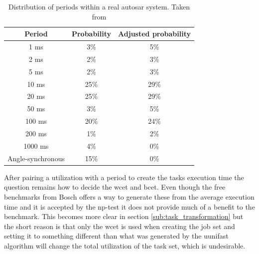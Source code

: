 \documentclass{kththesis}
\begin{document}
\begin{table}
    \centering
    \begin{tabular}{| c | c | c |} 
        \hline
        Period & Probability & Adjusted probability  \\
        \hline
        1 ms & 3\% & 5\% \\
        \hline
        2 ms & 2\% & 3\% \\
        \hline
        5 ms & 2\% & 3\% \\
        \hline
        10 ms & 25\% & 29\% \\
        \hline
        20 ms & 25\% & 29\% \\
        \hline
        50 ms & 3\% & 5\% \\
        \hline
        100 ms & 20\% & 24\% \\
        \hline
        200 ms & 1\% & 2\% \\
        \hline
        1000 ms & 4\% & 0\% \\
        \hline
        Angle-synchronous & 15\% & 0\% \\
        \hline
    \end{tabular}
    \caption{Distribution of periods within a real \acrshort{autosar} system. Taken from \parencite{kramer_real_2015}}
    \label{tab:period_distribution}
\end{table}

After pairing a utilization with a period to create the tasks execution time the question remains
how to decide the \acrshort{wcet} and \acrshort{bcet}. Even though the free benchmarks from Bosch
offers a way to generate these from the average execution time and it is accepted by the
\acrshort{np}-test it does not provide much of a benefit to the benchmark. This becomes more clear
in section \ref{sub:task_transformation} but the short reason is that only the \acrshort{wcet} is
used when creating the job set and setting it to something different than what was generated by the
uunifast algorithm will change the total utilization of the task set, which is undesirable.
\end{document}

